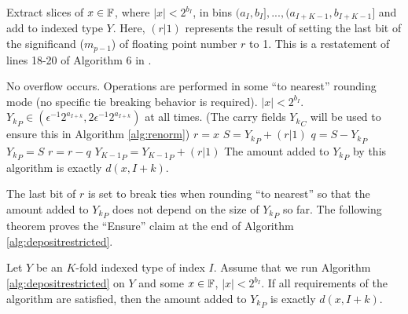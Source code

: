       \begin{samepage}
      \begin{alg}
        Extract slices of $x \in \mathbb{F}$, where $|x| < 2^{b_I}$, in bins $(a_I,
        b_I], ..., (a_{I + K - 1}, b_{I + K - 1}]$ and add to indexed type $Y$.
        Here, $(r | 1)$ represents the result of setting the last bit of the
        significand ($m_{p - 1}$) of floating point number $r$ to 1. This is a
        restatement of lines 18-20 of Algorithm $6$ in \cite{repsum}.
        \begin{algorithmic}[1]
          \Require
          \Statex No overflow occurs.
          \Statex Operations are performed in some ``to nearest'' rounding mode
          (no specific tie breaking behavior is required).
          \Statex $|x| < 2^{b_I}$.
          \Statex ${Y_k}_P \in (\epsilon^{-1}  2^{a_{I + k}}, 2  \epsilon^{-1}  2^{a_{I + k}})$ at all times. (The carry fields ${Y_k}_C$ will be used to ensure this in Algorithm \ref{alg:renorm})
            \State $r = x$ \label{alg:depositrestricted:rgetsx}
             \label{alg:depositrestricted:loop}
              \State $S = {Y_k}_P + (r | 1)$ \label{alg:depositrestricted:split}
              \State $q = S - {Y_k}_P$
              \State ${Y_k}_P = S$
              \State $r = r - q$\label{alg:depositrestricted:endsplit}
            \EndFor
            \State ${Y_{K - 1}}_P = {Y_{K - 1}}_P + (r | 1)$
          \EndFunction
          \Ensure
          \Statex The amount added to ${Y_k}_P$ by this algorithm is exactly $d(x, I + k)$.
        \end{algorithmic}
        \label{alg:depositrestricted}
      \end{alg}
      \end{samepage}

      The last bit of $r$ is set to break ties when rounding ``to nearest'' so
      that the amount added to ${Y_k}_P$ does not depend on the size of
      ${Y_k}_P$ so far. The following theorem proves the ``Ensure'' claim at
      the end of Algorithm \ref{alg:depositrestricted}.

    \begin{samepage}
      \begin{thm}
        Let $Y$ be an $K$-fold indexed type of index $I$. Assume that we run
        Algorithm \ref{alg:depositrestricted} on $Y$ and some $x \in \mathbb{F}$, $|x|
        < 2^{b_I}$. If all requirements of the algorithm are satisfied, then
        the amount added to ${Y_k}_P$ is exactly $d(x, I + k)$.
        \label{thm:ddepositrestricted}
      \end{thm}
    \end{samepage}

